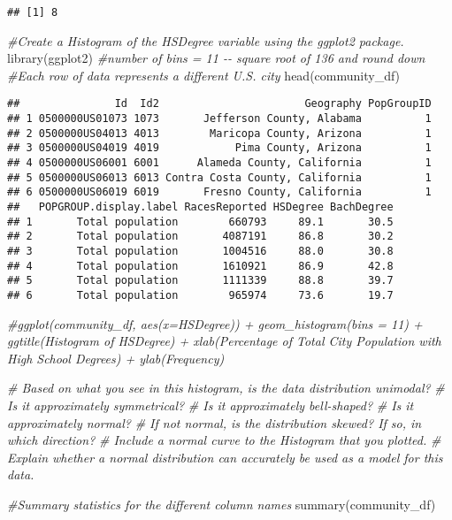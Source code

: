 \documentclass[
]{article}
\newenvironment{Shaded}{\begin{snugshade}}{\end{snugshade}}
\newcommand{\CommentTok}[1]{\textcolor[rgb]{0.56,0.35,0.01}{\textit{#1}}}
\newcommand{\FunctionTok}[1]{\textcolor[rgb]{0.00,0.00,0.00}{#1}}
\newcommand{\NormalTok}[1]{#1}
\begin{document}
\begin{verbatim}
## [1] 8
\end{verbatim}

\begin{Shaded}
\begin{Highlighting}[]
\CommentTok{\#Create a Histogram of the HSDegree variable using the ggplot2 package.}
\FunctionTok{library}\NormalTok{(ggplot2)}
\CommentTok{\#number of bins = 11 {-}{-} square root of 136 and round down}
\CommentTok{\#Each row of data represents a different U.S. city}
\FunctionTok{head}\NormalTok{(community\_df)}
\end{Highlighting}
\end{Shaded}

\begin{verbatim}
##               Id  Id2                       Geography PopGroupID
## 1 0500000US01073 1073       Jefferson County, Alabama          1
## 2 0500000US04013 4013        Maricopa County, Arizona          1
## 3 0500000US04019 4019            Pima County, Arizona          1
## 4 0500000US06001 6001      Alameda County, California          1
## 5 0500000US06013 6013 Contra Costa County, California          1
## 6 0500000US06019 6019       Fresno County, California          1
##   POPGROUP.display.label RacesReported HSDegree BachDegree
## 1       Total population        660793     89.1       30.5
## 2       Total population       4087191     86.8       30.2
## 3       Total population       1004516     88.0       30.8
## 4       Total population       1610921     86.9       42.8
## 5       Total population       1111339     88.8       39.7
## 6       Total population        965974     73.6       19.7
\end{verbatim}

\begin{Shaded}
\begin{Highlighting}[]
\CommentTok{\#ggplot(community\_df, aes(x=HSDegree)) + geom\_histogram(bins = 11) + ggtitle(\textquotesingle{}Histogram of HSDegree\textquotesingle{}) + xlab(\textquotesingle{}Percentage of Total City Population with High School Degrees\textquotesingle{}) + ylab(\textquotesingle{}Frequency\textquotesingle{})}

\CommentTok{\# Based on what you see in this histogram, is the data distribution unimodal?}
\CommentTok{\# Is it approximately symmetrical?}
\CommentTok{\# Is it approximately bell{-}shaped?}
\CommentTok{\# Is it approximately normal?}
\CommentTok{\# If not normal, is the distribution skewed? If so, in which direction?}
\CommentTok{\# Include a normal curve to the Histogram that you plotted.}
\CommentTok{\# Explain whether a normal distribution can accurately be used as a model for this data.}

\CommentTok{\#Summary statistics for the different column names}
\FunctionTok{summary}\NormalTok{(community\_df)}
\end{Highlighting}
\end{Shaded}
\end{document}
